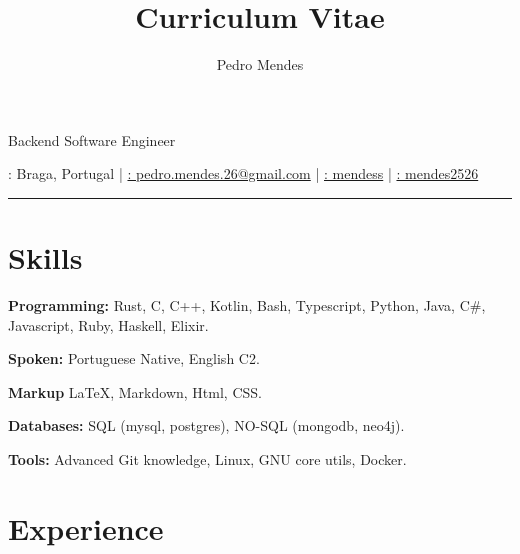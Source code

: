 \documentclass{article}
\makeatletter
\renewcommand{\maketitle}
{
    \begin{center}
        {\huge\bfseries\theauthor}

        \vspace{.25em}

        \Large{Backend Software Engineer}

        \vspace{.25em}

        \large{\thetitle}

        \vspace{.25em}

        \faMapMarker: Braga, Portugal |
        \href{mailto:pedro.mendes.26@gmail.com}{\faEnvelope: pedro.mendes.26@gmail.com} |
        \href{https://github.com/mendess}{\faGithub: mendess} |
        \href{https://www.linkedin.com/in/mendes2526/}{\faLinkedinSquare: mendes2526}

    \end{center}
}
\makeatother
\begin{document}
\title{Curriculum Vitae}
\author{Pedro Mendes}

\maketitle

\hrule

\section{Skills}

\begin{multicols}{2}

    \textbf{Programming:} Rust, C, C++, Kotlin, Bash, Typescript, Python, Java, C\#,
    Javascript, Ruby, Haskell, Elixir.

    \textbf{Spoken:} Portuguese Native, English C2.

    \textbf{Markup} \LaTeX, Markdown, Html, CSS\@.

    \textbf{Databases:} SQL (mysql, postgres), NO-SQL (mongodb, neo4j).

    \textbf{Tools:} Advanced Git knowledge, Linux, GNU core utils, Docker.

\end{multicols}

\section{Experience}
\end{document}
